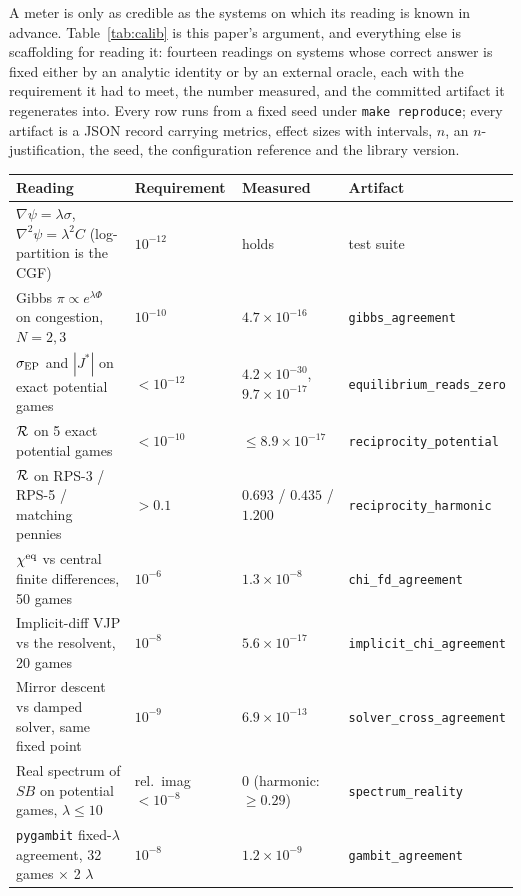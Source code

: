 A meter is only as credible as the systems on which its reading is known in
advance. Table~\ref{tab:calib} is this paper's argument, and everything else is
scaffolding for reading it: fourteen readings on systems whose correct answer is fixed
either by an analytic identity or by an external oracle, each with the
requirement it had to meet, the number measured, and the committed artifact it
regenerates into. Every row runs from a fixed seed under \texttt{make
reproduce}; every artifact is a JSON record carrying metrics, effect sizes with
intervals, $n$, an $n$-justification, the seed, the configuration reference and
the library version.

\begin{table}[t]
\centering\footnotesize
\setlength{\tabcolsep}{4pt}
\begin{tabular}{@{}>{\raggedright\arraybackslash}p{5.2cm}>{\raggedright\arraybackslash}p{1.8cm}>{\raggedright\arraybackslash}p{3.2cm}>{\raggedright\arraybackslash}p{4.1cm}@{}}
\toprule
Reading & Requirement & Measured & Artifact \\
\midrule
$\nabla\psi=\lambda\sigma$, $\nabla^2\psi=\lambda^2C$ (log-partition is the CGF) & $10^{-12}$ & holds & test suite \\
Gibbs $\pi\propto e^{\lambda\Phi}$ on congestion, $N{=}2,3$ & $10^{-10}$ & $4.7\times10^{-16}$ & \texttt{gibbs\_agreement} \\
$\sigma_{\mathrm{EP}}$ and $|J^*|$ on exact potential games & $<10^{-12}$ & $4.2\times10^{-30}$, $9.7\times10^{-17}$ & \texttt{equilibrium\_reads\_zero} \\
$\mathcal{R}$ on 5 exact potential games & $<10^{-10}$ & $\le 8.9\times10^{-17}$ & \texttt{reciprocity\_potential} \\
$\mathcal{R}$ on RPS-3 / RPS-5 / matching pennies & $>0.1$ & $0.693$ / $0.435$ / $1.200$ & \texttt{reciprocity\_harmonic} \\
$\chi^{\mathrm{eq}}$ vs central finite differences, 50 games & $10^{-6}$ & $1.3\times10^{-8}$ & \texttt{chi\_fd\_agreement} \\
Implicit-diff VJP vs the resolvent, 20 games & $10^{-8}$ & $5.6\times10^{-17}$ & \texttt{implicit\_chi\_agreement} \\
Mirror descent vs damped solver, same fixed point & $10^{-9}$ & $6.9\times10^{-13}$ & \texttt{solver\_cross\_agreement} \\
Real spectrum of $SB$ on potential games, $\lambda\le10$ & rel.\ imag $<10^{-8}$ & $0$ (harmonic: $\ge0.29$) & \texttt{spectrum\_reality} \\
\texttt{pygambit} fixed-$\lambda$ agreement, 32 games $\times$ 2 $\lambda$ & $10^{-8}$ & $1.2\times10^{-9}$ & \texttt{gambit\_agreement} \\

\end{tabular}
\end{table}
